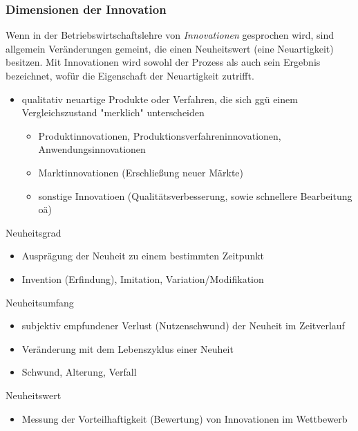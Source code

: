 \documentclass[11pt]{article}
\begin{document}
\subsubsection{Dimensionen der Innovation}
\label{sec:org802233a}
Wenn in der Betriebswirtschaftslehre von \emph{Innovationen} gesprochen wird, sind allgemein Veränderungen gemeint, die einen Neuheitswert (eine Neuartigkeit) besitzen. Mit Innovationen wird sowohl der Prozess als auch sein Ergebnis bezeichnet, wofür die Eigenschaft der Neuartigkeit zutrifft.
\begin{itemize}
\item qualitativ neuartige Produkte oder Verfahren, die sich ggü einem Vergleichszustand "merklich" unterscheiden
\begin{itemize}
\item Produktinnovationen, Produktionsverfahreninnovationen, Anwendungsinnovationen
\item Marktinnovationen (Erschließung neuer Märkte)
\item sonstige Innovatioen (Qualitätsverbesserung, sowie schnellere Bearbeitung oä)
\end{itemize}
\end{itemize}

Neuheitsgrad
\begin{itemize}
\item Ausprägung der Neuheit zu einem bestimmten Zeitpunkt
\item Invention (Erfindung), Imitation, Variation/Modifikation
\end{itemize}

Neuheitsumfang
\begin{itemize}
\item subjektiv empfundener Verlust (Nutzenschwund) der Neuheit im Zeitverlauf
\item Veränderung mit dem Lebenszyklus einer Neuheit
\item Schwund, Alterung, Verfall
\end{itemize}

Neuheitswert
\begin{itemize}
\item Messung der Vorteilhaftigkeit (Bewertung) von Innovationen im Wettbewerb
\end{itemize}
\end{document}
